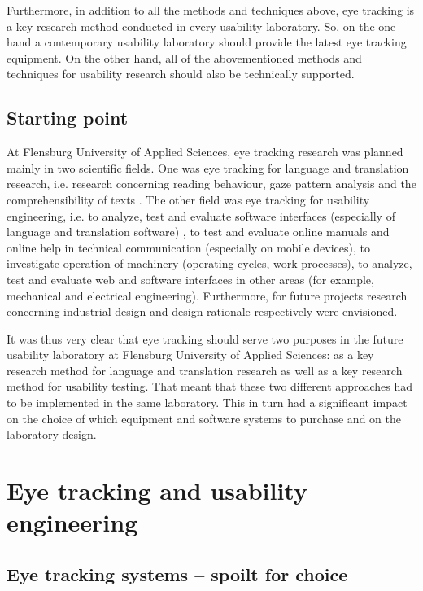\documentclass[output=paper]{langsci/langscibook}
\begin{document}
Furthermore, in addition to all the methods and techniques above, eye tracking is a key research method conducted in every usability laboratory. So, on the one hand a contemporary usability laboratory should provide the latest eye tracking equipment. On the other hand, all of the abovementioned methods and techniques for usability research should also be technically supported.

\subsection{Starting point}

At Flensburg University of Applied Sciences, eye tracking research was planned mainly in two scientific fields. One was eye tracking for language and translation research, i.e. research concerning reading behaviour, gaze pattern analysis and the comprehensibility of texts \citep{Hennig2007}. The other field was eye tracking for usability engineering, i.e. to analyze, test and evaluate software interfaces (especially of language and translation software) \citep{HansenSchirra2013}, to test and evaluate online manuals and online help in technical communication (especially on mobile devices), to investigate operation of machinery (operating cycles, work processes), to analyze, test and evaluate web and software interfaces in other areas (for example, mechanical and electrical engineering). Furthermore, for future projects research concerning industrial design and design rationale respectively were envisioned.


It was thus very clear that eye tracking should serve two purposes in the future usability laboratory at Flensburg University of Applied Sciences: as a key research method for language and translation research as well as a key research method for usability testing. That meant that these two different approaches had to be implemented in the same laboratory. This in turn had a significant impact on the choice of which equipment and software systems to purchase and on the laboratory design.


\section{Eye tracking and usability engineering }

\subsection{Eye tracking systems -- spoilt for choice }
\end{document}
